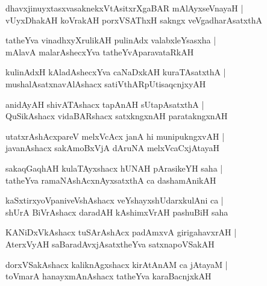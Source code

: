 \documentclass[twoside,12pt,openright]{book}
\newcounter{shloka}[chapter]
\begin{document}
\begin{shloka}
dhavxjinuyxtasxvasaknekxVtAsitxrXgaBAR mAlAyxseVnayaH |\\
vUyxDhakAH koVrakAH porxVSAThxH sakngx veVgadharAsatxthA
\end{shloka}

\begin{shloka}
tatheYva vinadhxyXrulikAH pulinAdx valabxleYsasxha |\\
mAlavA malarAshecxYva tatheYvAparavataRkAH
\end{shloka}

\begin{shloka}
kulinAdxH kAladAshecxYva caNaDxkAH kuraTAsatxthA |\\
mushalAsatxnavAlAshacx satiVthARpUtisaqcnjxyAH
\end{shloka}

\begin{shloka}
anidAyAH shivATAshacx tapAnAH sUtapAsatxthA |\\
QuSikAshacx vidaBARshacx satxkngxnAH paratakngxnAH
\end{shloka}

\begin{shloka}
utatxrAshAcxpareV melxVcAcx janA hi munipukngxvAH |\\
javanAshacx sakAmoBxVjA dAruNA melxVcaCxjAtayaH
\end{shloka}

\begin{shloka}
sakaqGaqhAH kulaTAyxshacx hUNAH pArasikeYH saha |\\
tatheYva ramaNAshAcxnAyxsatxthA ca dashamAnikAH 
\end{shloka}

\begin{shloka}
kaSxtirxyoVpaniveVshAshacx veYshayxshUdarxkulAni ca |\\
shUrA BiVrAshacx daradAH kAshimxVrAH pashuBiH saha
\end{shloka}

\begin{shloka}
KANiDxVkAshacx tuSArAshAcx padAmxvA girigahavxrAH |\\
AterxVyAH saBaradAvxjAsatxtheYva satxnapoVSakAH
\end{shloka}

\begin{shloka}
dorxVSakAshacx kaliknAgxshacx kirAtAnAM ca jAtayaM |\\
toVmarA hanayxmAnAshacx tatheYva karaBacnjxkAH
\end{shloka}
\end{document}
